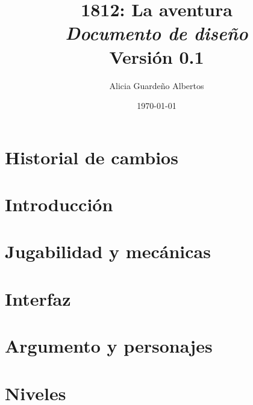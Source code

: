 \documentclass[a4paper,11pt,titlepage]{book}
\title{{\Huge \bf 1812: La aventura}\\{\large \em Documento de diseño}\\{\normalsize Versión 0.1}}
\author{Alicia Guardeño Albertos}
\date{\today}
\begin{document}
\renewcommand{\figurename}{Figura}
\renewcommand{\listfigurename}{Indice de figuras}
\renewcommand{\tablename}{Tabla}
\renewcommand{\listtablename}{Indice de tablas}

\vfill
\maketitle
\vfill
    \tableofcontents

\setlength{\parskip}{\baselineskip} %

\chapter{Historial de cambios}
\label{chap:historial}


\chapter{Introducción}%
\label{chap:introduccion}


\chapter{Jugabilidad y mecánicas}
\label{chap:jugabilidad}


\chapter{Interfaz}
\label{chap:interfaz}


\chapter{Argumento y personajes}%
\label{chap:argumento}


\chapter{Niveles}
\label{chap:niveles}

\end{document}
